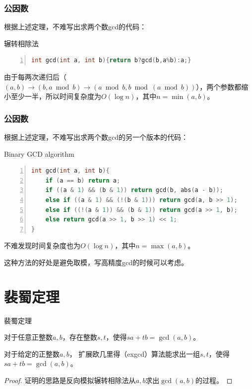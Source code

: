 \documentclass{ctexbeamer}        %
\begin{document}
\begin{frame}[fragile]
\frametitle{公因数}

根据上述定理，不难写出求两个数gcd的代码：
\begin{block}{辗转相除法}
\begin{lstlisting}[language={c++},
                   numbers=left]
int gcd(int a, int b){return b?gcd(b,a%b):a;}
\end{lstlisting}
\end{block}
由于每两次递归后（$(a,b)\rightarrow(b,a \bmod b)\rightarrow(a\bmod b,b \bmod(a\bmod b))$），两个参数都缩小至少一半，所以时间复杂度为$O(\log n)$，其中$n=\min(a,b)$。
\end{frame}

\begin{frame}[fragile]
\frametitle{公因数}

根据上述定理，不难写出求两个数gcd的另一个版本的代码：
\begin{block}{Binary GCD algorithm}
\begin{lstlisting}[language={c++},
                   numbers=left]
int gcd(int a, int b){
    if (a == b) return a;
    if ((a & 1) && (b & 1)) return gcd(b, abs(a - b));
    else if ((a & 1) && (!(b & 1))) return gcd(a, b >> 1);
    else if ((!(a & 1)) && (b & 1)) return gcd(a >> 1, b);
    else return gcd(a >> 1, b >> 1) << 1;
}
\end{lstlisting}
\end{block}
不难发现时间复杂度也为$O(\log n)$，其中$n=\max(a,b)$。

这种方法的好处是避免取模，写高精度gcd的时候可以考虑。
\end{frame}

\section{裴蜀定理}

\begin{frame}{裴蜀定理}

\begin{theorem}[裴蜀定理]
    对于任意正整数$a,b$，存在整数$s,t$，使得$sa+tb=\gcd(a,b)$。
\end{theorem}

\begin{definition}[扩展欧几里得算法]
   对于给定的正整数$a,b$， 扩展欧几里得（exgcd）算法能求出一组$s,t$，使得$sa+tb=\gcd(a,b)$。
\end{definition}

\begin{proof}
    证明的思路是反向模拟辗转相除法从$a,b$求出$\gcd(a,b)$的过程。
\end{proof}

\end{frame}
\end{document}
